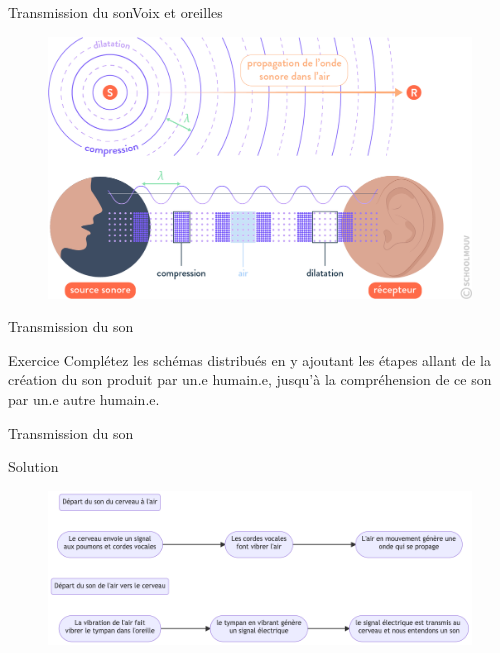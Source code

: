 \documentclass{beamer}
\begin{document}
\begin{frame}{Transmission du son}{Voix et oreilles}
	\begin{figure}
		\includegraphics[width=0.65\linewidth]{transmission-son.png}
	\end{figure}
	\href{https://youtu.be/QEpk6feHMxQ}{}
\end{frame}

\begin{frame}{Transmission du son}{}

	\begin{alertblock}{Exercice}
		Complétez les schémas distribués en y ajoutant les étapes allant de la création du son produit par un.e humain.e, jusqu'à la compréhension de ce son par un.e autre humain.e.
	\end{alertblock}

\end{frame}

\begin{frame}{Transmission du son}{}
	\begin{exampleblock}{Solution}
		\begin{figure}
			\includegraphics[width=1\linewidth]{solution-transmission-son.png}
		\end{figure}
	\end{exampleblock}

\end{frame}
\end{document}
